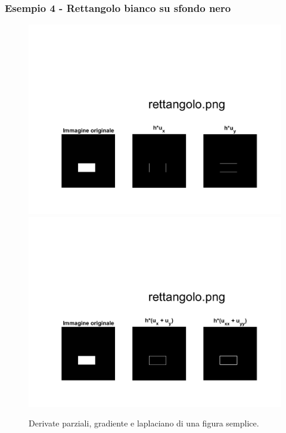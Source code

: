 \subsubsection{Esempio 4 - Rettangolo bianco su sfondo nero}
\begin{figure}[htb] 
\centering
\includegraphics[scale=0.4, trim = 0 0 0 10.5cm, clip]{Pictures/Risultati/rettangolo bianco e nero derivate parziali.png}
\includegraphics[scale=0.4, trim = 0 0 0 10.5cm, clip]{Pictures/Risultati/rettangolo bianco e nero gradiente e laplaciano.png}
\caption{Derivate parziali, gradiente e laplaciano di una figura semplice.}\label{fig:figura}
\end{figure}

